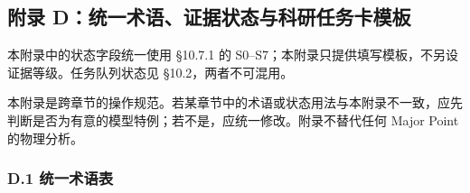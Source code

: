 \documentclass[
]{article}
\begin{document}
\subsection{附录
D：统一术语、证据状态与科研任务卡模板}\label{ux9644ux5f55-dux7edfux4e00ux672fux8bedux8bc1ux636eux72b6ux6001ux4e0eux79d1ux7814ux4efbux52a1ux5361ux6a21ux677f}

本附录中的状态字段统一使用 §10.7.1 的
S0--S7；本附录只提供填写模板，不另设证据等级。任务队列状态见
§10.2，两者不可混用。

本附录是跨章节的操作规范。若某章节中的术语或状态用法与本附录不一致，应先判断是否为有意的模型特例；若不是，应统一修改。附录不替代任何
Major Point 的物理分析。

\subsubsection{D.1 统一术语表}\label{d.1-ux7edfux4e00ux672fux8bedux8868}
\end{document}
